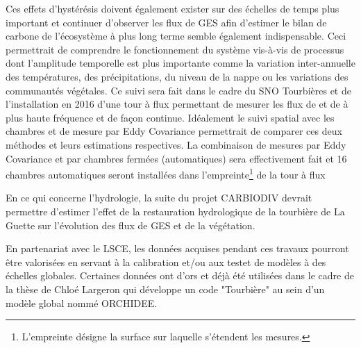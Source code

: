 Ces effets d'hystérésis doivent également exister sur des échelles de temps plus important et continuer d'observer les flux de GES afin d'estimer le bilan de carbone de l'écosystème à plus long terme semble également indispensable.
Ceci permettrait de comprendre le fonctionnement du système vis-à-vis de processus dont l'amplitude temporelle est plus importante comme la variation inter-annuelle des températures, des précipitations, du niveau de la nappe ou les variations des communautés végétales.
Ce suivi sera fait dans le cadre du SNO Tourbières et de l'installation en 2016 d'une tour à flux permettant de mesurer les flux de \coo et de \chh à plus haute fréquence et de façon continue.
Idéalement le suivi spatial avec les chambres et de mesure par Eddy Covariance permettrait de comparer ces deux méthodes et leurs estimations respectives. 
La combinaison de mesures par Eddy Covariance et par chambres fermées (automatiques) sera effectivement fait et 16 chambres automatiques seront installées dans l'empreinte\footnote{L'empreinte désigne la surface sur laquelle s'étendent les mesures.} de la tour à flux

En ce qui concerne l'hydrologie, la suite du projet CARBIODIV devrait permettre d'estimer l'effet de la restauration hydrologique de la tourbière de La Guette sur l'évolution des flux de GES et de la végétation.

En partenariat avec le LSCE, les données acquises pendant ces travaux pourront être valorisées en servant à la calibration et/ou aux testet de modèles à des échelles globales.
Certaines données ont d'ors et déjà été utilisées dans le cadre de la thèse de Chloé Largeron qui développe un code "Tourbière" au sein d'un modèle global nommé ORCHIDEE.







%
%
%
%


%
%


